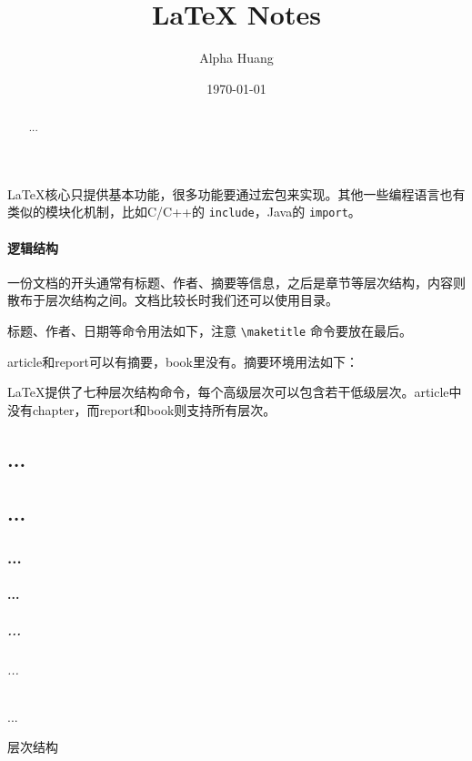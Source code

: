 \LaTeX 核心只提供基本功能，很多功能要通过宏包来实现。其他一些编程语言也有类似的模块化机制，比如C/C++的 \texttt{include}，Java的 \texttt{import}。

\subsection{逻辑结构}

一份文档的开头通常有标题、作者、摘要等信息，之后是章节等层次结构，内容则散布于层次结构之间。文档比较长时我们还可以使用目录。

标题、作者、日期等命令用法如下，注意 \verb|\maketitle| 命令要放在最后。

\begin{Code}[]
\title{LaTeX Notes}
\author{Alpha Huang}
\date{\today}
\maketitle
\end{Code}

article和report可以有摘要，book里没有。摘要环境用法如下：

\begin{Code}[]
\begin{abstract}
...
\end{abstract}
\end{Code}

\LaTeX 提供了七种层次结构命令，每个高级层次可以包含若干低级层次。article中没有chapter，而report和book则支持所有层次。

\begin{example}[h]
\begin{Code}[numbers=left]
\part{...}          %
\chapter{...}       %
\section{...}       %
\subsection{...}    %
\subsubsection{...} %
\paragraph{...}     %
\subparagraph{...}  %
\end{Code}
\caption{层次结构}
\label{tab:structure}
\end{example}

